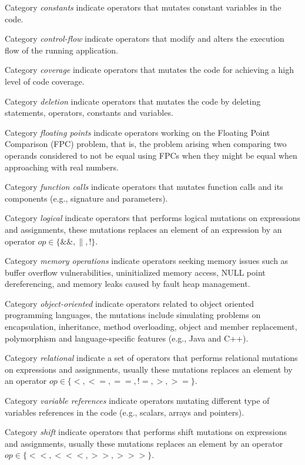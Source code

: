 Category \emph{constants} indicate operators that mutates constant variables in the code. 

Category \emph{control-flow} indicate operators that modify and alters the execution flow of the running application.

Category \emph{coverage} indicate operators that mutates the code for achieving a high level of code coverage.

Category \emph{deletion} indicate operators that mutates the code by deleting statements, operators, constants and variables.  

Category \emph{floating points} indicate operators working on the Floating Point Comparison (FPC) problem, that is, the problem arising when comparing two operands considered to not be equal using FPCs when they might be equal when approaching with real numbers.

Category \emph{function calls} indicate operators that mutates function calls and its components (e.g., signature and parameters).

Category \emph{logical} indicate operators that performs logical mutations on expressions and assignments, these mutations replaces an element of an expression by an operator $op \in \{\&\&, \|, !\}$.

Category \emph{memory operations} indicate operators seeking memory issues such as buffer overflow vulnerabilities, uninitialized memory access, NULL point dereferencing, and memory leaks caused by fault heap management.

Category \emph{object-oriented} indicate operators related to object oriented programming languages, the mutations include simulating problems on encapsulation, inheritance, method overloading, object and member replacement, polymorphism and language-specific features (e.g., Java and C++).

Category \emph{relational} indicate a set of operators that performs relational mutations on expressions and assignments, usually these mutations replaces an element by an operator $op \in \{<, <=, ==, !=, >, >=\}$.

Category \emph{variable references} indicate operators mutating different type of variables references in the code (e.g., scalars, arrays and pointers).

Category \emph{shift} indicate operators that performs shift mutations on expressions and assignments, usually these mutations replaces an element by an operator $op \in \{<<, <<<, >>, >>>\}$.


